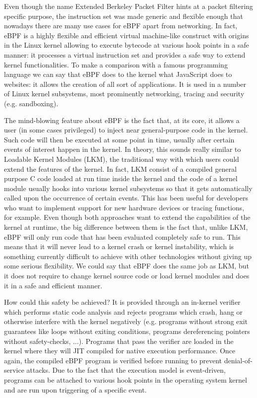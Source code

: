 Even though the name Extended Berkeley Packet Filter hints at a packet filtering specific purpose, the instruction set was made generic and flexible enough that nowadays there are many use cases for eBPF apart from networking. 
In fact, eBPF is a highly flexible and efficient virtual machine-like construct with origins in the Linux kernel allowing to execute bytecode at various hook points in a safe manner: it processes a virtual instruction set and provides a safe way to extend kernel functionalities.
To make a comparison with a famous programming language we can say that eBPF does to the kernel what JavaScript does to websites: it allows the creation of all sort of applications.
It is used in a number of Linux kernel subsystems, most prominently networking, tracing and security (e.g. sandboxing).

The mind-blowing feature about eBPF is the fact that, at its core, it allows a user (in some cases privileged) to inject near general-purpose code in the kernel. 
Such code will then be executed at some point in time, usually after certain events of interest happen in the kernel. 
In theory, this sounds really similar to Loadable Kernel Modules (LKM), the traditional way with which users could extend the features of the kernel.
In fact, LKM consist of a compiled general purpose C code loaded at run time inside the kernel and the code of a kernel module usually hooks into various kernel subsystems so that it gets automatically called upon the occurrence of certain events.
This has been useful for developers who want to implement support for new hardware devices or tracing functions, for example.
Even though both approaches want to extend the capabilities of the kernel at runtime, the big difference between them is the fact that, unlike LKM, eBPF will only run code that has been evaluated completely safe to run.
This means that it will never lead to a kernel crash or kernel instability, which is something currently difficult to achieve with other technologies without giving up some serious flexibility. 
We could say that eBPF does the same job as LKM, but it does not require to change kernel source code or load kernel modules and does it in a safe and efficient manner.

How could this safety be achieved? It is provided through an in-kernel verifier which performs static code analysis and rejects programs which crash, hang or otherwise interfere with the kernel negatively (e.g. programs without strong exit guarantees like loops without exiting conditions, programs dereferencing pointers without safety-checks, ...).
Programs that pass the verifier are loaded in the kernel where they will JIT compiled for native execution performance.
Once again, the compiled eBPF program is verified before running to prevent denial-of-service attacks.
Due to the fact that the execution model is event-driven, programs can be attached to various hook points in the operating system kernel and are run upon triggering of a specific event.

